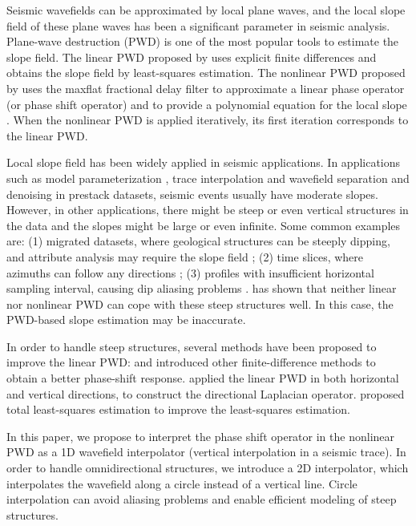 Seismic wavefields can be approximated by local plane waves,
and the local slope field of these plane waves
has been a significant parameter in seismic analysis.
Plane-wave destruction (PWD) is one of the most popular tools 
to estimate the slope field.
The linear PWD proposed by \cite{claerbout1992earth} 
uses explicit finite differences and
obtains the slope field by least-squares estimation.  
The nonlinear PWD proposed by \cite{fomel:1946} 
uses the maxflat fractional delay filter 
\cite[]{thiran1971recursive,zhang2009maxflat}
to approximate a linear phase operator (or phase shift operator)
and to provide a polynomial equation for the local slope \cite[]{chen:2012a}. 
When the nonlinear PWD is applied iteratively,
its first iteration corresponds to the linear PWD.



Local slope field
has been widely applied in seismic applications.
In applications such as 
model parameterization \cite[]{fomel:A43,fomel:U89},
trace interpolation \cite[]{bardan1987trace}
and wavefield separation and denoising \cite[]{harlan:1869}
in prestack datasets,
seismic events usually have moderate slopes.
However, in other applications,
there might be steep or even vertical structures in the data
and the slopes might be large or even infinite.
Some common examples are:
(1) migrated datasets, where
geological structures can be steeply dipping,
and attribute analysis may require the slope field
\cite[]{marfurt:104};
(2) time slices, where azimuths
can follow any directions
\cite[ Figure 2a is a good example]{marfurt:P29};
(3) profiles with insufficient horizontal sampling interval,
causing dip aliasing problems \cite[]{barnes:264}.
\cite{halelocal} has shown that neither linear nor nonlinear PWD 
can cope with these steep structures well.
In this case, the PWD-based slope estimation may be inaccurate.

In order to handle steep structures, 
several methods have 
been proposed to improve the linear PWD:
\cite{davis:2775} and \cite{Noye2000385} introduced other finite-difference 
methods to obtain a better phase-shift response.
\cite{halelocal} applied the linear PWD 
in both horizontal and vertical directions,
to construct the directional Laplacian operator.
\cite{schleicher:P25} proposed total least-squares estimation
to improve the least-squares estimation.

In this paper, we propose to interpret
the phase shift operator in the nonlinear PWD as 
a 1D wavefield interpolator 
(vertical interpolation in a seismic trace).
In order to handle omnidirectional structures,
we introduce a 2D interpolator,
which interpolates the wavefield along
a circle instead of a vertical line.
Circle interpolation can avoid aliasing problems and enable
efficient modeling of steep structures.

